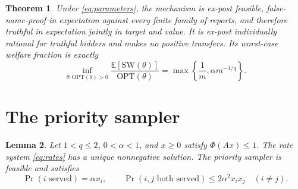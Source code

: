 \documentclass[11pt]{article}
\newtheorem{theorem}{Theorem}[section]
\newtheorem{lemma}[theorem]{Lemma}
\begin{document}
\begin{theorem}
\label{thm:main}
Under \eqref{eq:parameters}, the mechanism is ex-post feasible,
false-name-proof in expectation against every finite family of
reports, and therefore truthful in expectation jointly in target
and value.
It is ex-post individually rational for truthful bidders and makes
no positive transfers.
Its worst-case welfare fraction is exactly
\[
\inf_{\theta:\mathrm{OPT}(\theta)>0}
\frac{\mathbb{E}[\mathrm{SW}(\theta)]}{\mathrm{OPT}(\theta)}
=
\max\left\{\frac1m,\alpha m^{-1/q}\right\}.
\]
\end{theorem}


\section{The priority sampler}

\begin{lemma}
\label{lem:sampler}
Let $1<q\le2$, $0<\alpha<1$, and $x\ge0$ satisfy $\Phi(Ax)\le1$.
The rate system \eqref{eq:rates} has a unique nonnegative solution.
The priority sampler is feasible and satisfies
\begin{equation}
\label{eq:sampler-bounds}
\Pr(i\text{ served})=\alpha x_i,
\qquad
\Pr(i,j\text{ both served})\le2\alpha^2x_ix_j
\quad(i\ne j).
\end{equation}
\end{lemma}
\end{document}
